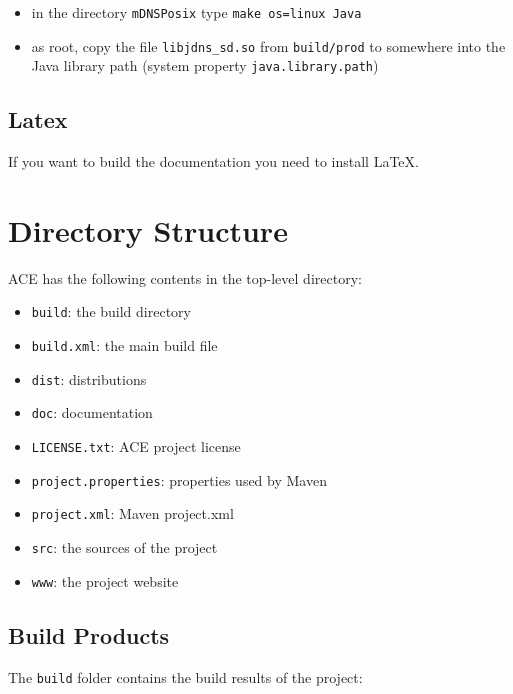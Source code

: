 \documentclass[11pt,a4paper]{article}
\begin{document}
\begin{itemize}
 \item in the directory \texttt{mDNSPosix} type \texttt{make os=linux Java}
 \item as root, copy the file \texttt{libjdns\_sd.so} from \texttt{build/prod} to somewhere into the Java library path (system property \texttt{java.library.path})
\end{itemize}


\subsection{Latex}
If you want to build the documentation you need to install \LaTeX{}.



\section{Directory Structure}
ACE has the following contents in the top-level directory:

\begin{itemize}
 \item \texttt{build}: the build directory
 \item \texttt{build.xml}: the main build file
 \item \texttt{dist}: distributions
 \item \texttt{doc}: documentation
 \item \texttt{LICENSE.txt}: ACE project license
 \item \texttt{project.properties}: properties used by Maven
 \item \texttt{project.xml}: Maven project.xml
 \item \texttt{src}: the sources of the project
 \item \texttt{www}: the project website
\end{itemize}


\subsection{Build Products}
The \texttt{build} folder contains the build results of the project:
\end{document}
